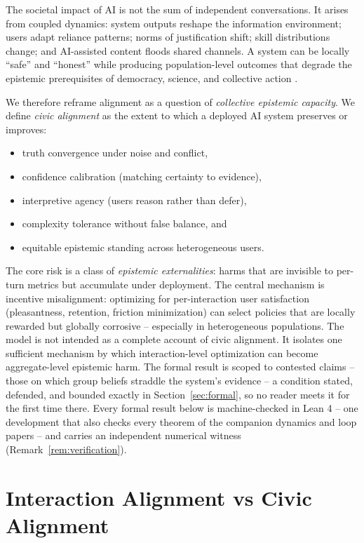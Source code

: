 \documentclass[11pt]{article}
\theoremstyle{definition}
\theoremstyle{remark}
\numberwithin{equation}{section}
\begin{document}
The societal impact of AI is not the sum of independent conversations. It arises from coupled dynamics: system outputs reshape the information environment; users adapt reliance patterns; norms of justification shift; skill distributions change; and AI-assisted content floods shared channels. A system can be locally ``safe'' and ``honest'' while producing population-level outcomes that degrade the epistemic prerequisites of democracy, science, and collective action \citep{seger2020tackling, kasirzadeh2025two}.

We therefore reframe alignment as a question of \emph{collective epistemic capacity}. We define \emph{civic alignment} as the extent to which a deployed AI system preserves or improves:
\begin{itemize}
  \item truth convergence under noise and conflict,
  \item confidence calibration (matching certainty to evidence),
  \item interpretive agency (users reason rather than defer),
  \item complexity tolerance without false balance, and
  \item equitable epistemic standing across heterogeneous users.
\end{itemize}

The core risk is a class of \emph{epistemic externalities}: harms that are invisible to per-turn metrics but accumulate under deployment. The central mechanism is incentive misalignment: optimizing for per-interaction user satisfaction (pleasantness, retention, friction minimization) can select policies that are locally rewarded \citep{perez2022discovering, sharma2024towards, gao2023scaling, sharma2026whos} but globally corrosive -- especially in heterogeneous populations. The model is not intended as a complete account of civic alignment. It isolates one sufficient mechanism by which interaction-level optimization can become aggregate-level epistemic harm. The formal result is scoped to contested claims -- those on which group beliefs straddle the system's evidence -- a condition stated, defended, and bounded exactly in Section~\ref{sec:formal}, so no reader meets it for the first time there. Every formal result below is machine-checked in Lean 4 -- one development that also checks every theorem of the companion dynamics and loop papers -- and carries an independent numerical witness (Remark~\ref{rem:verification}).

\section{Interaction Alignment vs Civic Alignment}\label{sec:vs}
\end{document}
